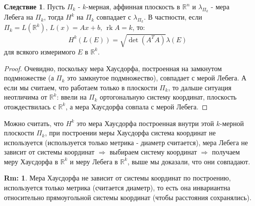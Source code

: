 \documentclass[12pt]{article}
\newcommand{\MR}{\mathbb{R}}
\theoremstyle{definition}
\newtheorem{rem}{Rm:}
\newtheorem{corollary}{Следствие}
\DeclareMathOperator{\rk}{\text{rk}}
\begin{document}
\begin{corollary}
	Пусть $\Pi_k$ - $k$-мерная, аффинная плоскость в $\MR^n$ и $\lambda_{\Pi_k}$ - мера Лебега на $\Pi_k$, тогда $H^k$ на $\Pi_k$ совпадает с $\lambda_{\Pi_k}$. В частности, если $\Pi_k = L(\MR^k), \, L(x) = Ax + b, \, \rk{A} = k$, то:
	$$
		H^k(L(E)) = \sqrt{\det{(A^TA)}}\lambda(E)
	$$ 
	для всякого измеримого $E$ в $\MR^k$.
\end{corollary}
\begin{proof}
	Очевидно, поскольку мера Хаусдорфа, построенная на замкнутом подмножестве (а $\Pi_k$ это замкнутое подмножество), совпадает с мерой Лебега. А если мы считаем, что работаем только в плоскости $\Pi_k$, то дальше ситуация неотличима от $\MR^k$: ввели на $\Pi_k$ ортогональную систему координат, плоскость отождествилась с $\MR^k$, а мера Хаусдорфа совпала с мерой Лебега.
\end{proof}
Можно считать, что $H^k$ это мера Хаусдорфа построенная внутри этой $k$-мерной плоскости $\Pi_k$, при построении меры Хаусдорфа система координат не используется (используется только метрика - диаметр считается), мера Лебега не зависит от системы координат $\Rightarrow$ выбираем систему координат $\Rightarrow$ получаем меру Хаусдорфа в $\MR^k$ и меру Лебега в $\MR^k$, выше мы доказали, что они совпадают. 
\begin{rem}
	Мера Хаусдорфа не зависит от системы координат по построению, используется только метрика (считается диаметр), то есть она инвариантна относительно прямоугольной системы координат (чтобы расстояния сохранялись).
\end{rem}
\end{document}
